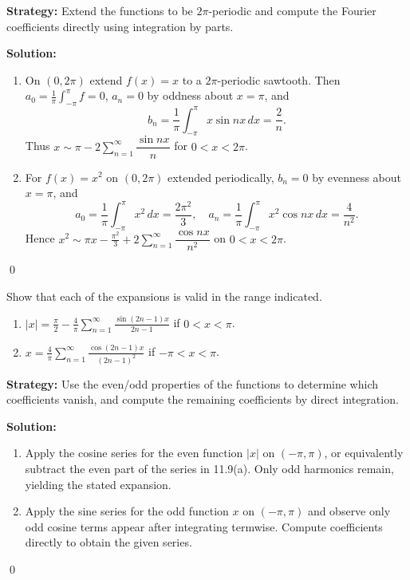 \noindent\textbf{Strategy:} Extend the functions to be $2\pi$-periodic and compute the Fourier coefficients directly using integration by parts.

\bigskip\noindent\textbf{Solution:}
\begin{enumerate}[label=(\alph*)]
\item On $(0,2\pi)$ extend $f(x)=x$ to a $2\pi$-periodic sawtooth. Then $a_0=\tfrac{1}{\pi}\int_{-\pi}^{\pi} f=0$, $a_n=0$ by oddness about $x=\pi$, and
\[b_n=\frac{1}{\pi}\int_{-\pi}^{\pi} x\sin nx\,dx=\frac{2}{n}.\]
Thus $x\sim \pi-2\sum_{n=1}^{\infty} \dfrac{\sin nx}{n}$ for $0<x<2\pi$.
\item For $f(x)=x^2$ on $(0,2\pi)$ extended periodically, $b_n=0$ by evenness about $x=\pi$, and
\[a_0=\frac{1}{\pi}\int_{-\pi}^{\pi} x^2\,dx=\frac{2\pi^2}{3},\quad a_n=\frac{1}{\pi}\int_{-\pi}^{\pi} x^2\cos nx\,dx=\frac{4}{n^2}.\]
Hence $x^2\sim \pi x-\tfrac{\pi^2}{3}+2\sum_{n=1}^{\infty}\dfrac{\cos nx}{n^2}$ on $0<x<2\pi$.
\end{enumerate}\qed


\begin{problembox}
Show that each of the expansions is valid in the range indicated.
\begin{enumerate}[label=(\alph*)]
\item $|x| = \frac{\pi}{2} - \frac{4}{\pi} \sum_{n=1}^\infty \frac{\sin (2n - 1)x}{2n - 1}$ if $0 < x < \pi$.
\item $x = \frac{4}{\pi} \sum_{n=1}^\infty \frac{\cos (2n - 1)x}{(2n - 1)^2}$ if $-\pi < x < \pi$.
\end{enumerate}
\end{problembox}

\noindent\textbf{Strategy:} Use the even/odd properties of the functions to determine which coefficients vanish, and compute the remaining coefficients by direct integration.

\bigskip\noindent\textbf{Solution:}
\begin{enumerate}[label=(\alph*)]
\item Apply the cosine series for the even function $|x|$ on $(-\pi,\pi)$, or equivalently subtract the even part of the series in 11.9(a). Only odd harmonics remain, yielding the stated expansion.
\item Apply the sine series for the odd function $x$ on $(-\pi,\pi)$ and observe only odd cosine terms appear after integrating termwise. Compute coefficients directly to obtain the given series.
\end{enumerate}\qed


